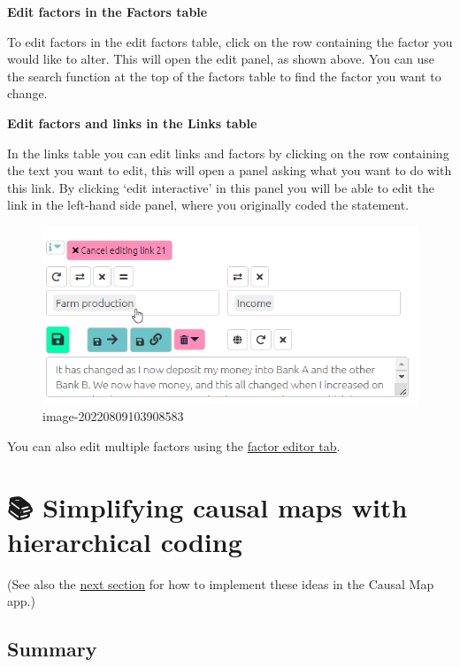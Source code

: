 \documentclass[
]{book}
\begin{document}
\textbf{Edit factors in the Factors table}

To edit factors in the edit factors table, click on the row containing the factor you would like to alter. This will open the edit panel, as shown above. You can use the search function at the top of the factors table to find the factor you want to change.

\textbf{Edit factors and links in the Links table}

In the links table you can edit links and factors by clicking on the row containing the text you want to edit, this will open a panel asking what you want to do with this link. By clicking `edit interactive' in this panel you will be able to edit the link in the left-hand side panel, where you originally coded the statement.

\begin{figure}
\centering
\includegraphics[width=6.77083in,height=\textheight]{_assets/image-20220809103908583.png}
\caption{image-20220809103908583}
\end{figure}

You can also edit multiple factors using the \protect\hyperlink{xfactor-editor}{factor editor tab}.

\hypertarget{xsimplifying-with-hierarchical}{%
\chapter{📚 Simplifying causal maps with hierarchical coding}\label{xsimplifying-with-hierarchical}}

(See also the \protect\hyperlink{xhierarchical-coding}{next section} for how to implement these ideas in the Causal Map app.)

\hypertarget{summary-3}{%
\section{Summary}\label{summary-3}}
\end{document}
